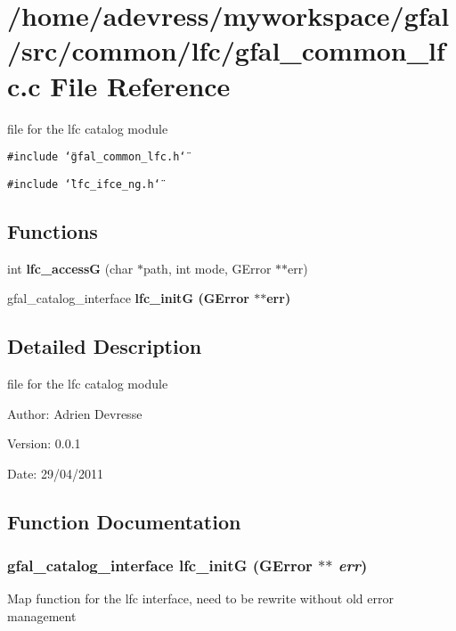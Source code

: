 \section{/home/adevress/myworkspace/gfal/src/common/lfc/gfal\_\-common\_\-lfc.c File Reference}
\label{gfal__common__lfc_8c}
file for the lfc catalog module 

{\tt \#include \char`\"{}gfal\_\-common\_\-lfc.h\char`\"{}}\par
{\tt \#include \char`\"{}lfc\_\-ifce\_\-ng.h\char`\"{}}\par
\subsection*{Functions}
\begin{CompactItemize}
\item 
int \textbf{lfc\_\-access\-G} (char $\ast$path, int mode, GError $\ast$$\ast$err)\label{gfal__common__lfc_8c_b3ae591453bd31787bf8c2911ee7fa2d}

\item 
gfal\_\-catalog\_\-interface \bf{lfc\_\-init\-G} (GError $\ast$$\ast$err)
\end{CompactItemize}


\subsection{Detailed Description}
file for the lfc catalog module 

\begin{Desc}
\item[Author:]Adrien Devresse \end{Desc}
\begin{Desc}
\item[Version:]0.0.1 \end{Desc}
\begin{Desc}
\item[Date:]29/04/2011 \end{Desc}


\subsection{Function Documentation}
\subsubsection{\setlength{\rightskip}{0pt plus 5cm}gfal\_\-catalog\_\-interface lfc\_\-init\-G (GError $\ast$$\ast$ {\em err})}\label{gfal__common__lfc_8c_5124dd492c064ffa79a7e9c6ff82c97e}


Map function for the lfc interface, need to be rewrite without old error management 
